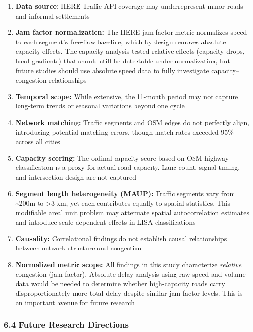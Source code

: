 \begin{enumerate}
\def\labelenumi{\arabic{enumi}.}
\tightlist
\item
  \textbf{Data source:} HERE Traffic API coverage may underrepresent minor roads and informal settlements
\item
  \textbf{Jam factor normalization:} The HERE jam factor metric normalizes speed to each segment's free-flow baseline, which by design removes absolute capacity effects. The capacity analysis tested relative effects (capacity drops, local gradients) that should still be detectable under normalization, but future studies should use absolute speed data to fully investigate capacity--congestion relationships
\item
  \textbf{Temporal scope:} While extensive, the 11-month period may not capture long-term trends or seasonal variations beyond one cycle
\item
  \textbf{Network matching:} Traffic segments and OSM edges do not perfectly align, introducing potential matching errors, though match rates exceeded 95\% across all cities
\item
  \textbf{Capacity scoring:} The ordinal capacity score based on OSM highway classification is a proxy for actual road capacity. Lane count, signal timing, and intersection design are not captured
\item
  \textbf{Segment length heterogeneity (MAUP):} Traffic segments vary from \textasciitilde200m to \textgreater3 km, yet each contributes equally to spatial statistics. This modifiable areal unit problem may attenuate spatial autocorrelation estimates and introduce scale-dependent effects in LISA classifications
\item
  \textbf{Causality:} Correlational findings do not establish causal relationships between network structure and congestion
\item
  \textbf{Normalized metric scope:} All findings in this study characterize \emph{relative} congestion (jam factor). Absolute delay analysis using raw speed and volume data would be needed to determine whether high-capacity roads carry disproportionately more total delay despite similar jam factor levels. This is an important avenue for future research
\end{enumerate}

\subsubsection{6.4 Future Research Directions}\label{future-research-directions}

